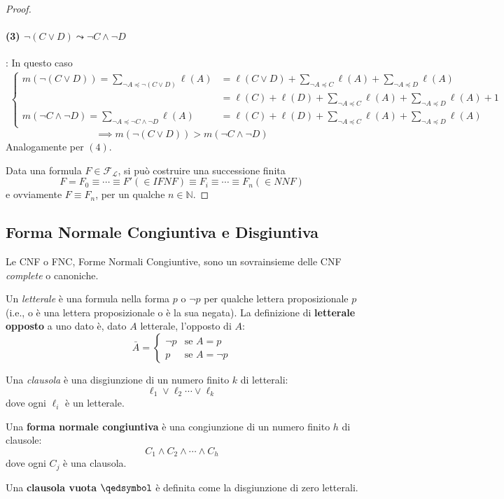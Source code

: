 \begin{proof}
\paragraph{(3) $\neg (C \lor D) \leadsto \neg C \land \neg D$}: In questo caso
\begin{align*}
  \begin{cases}
    m(\neg (C \lor D)) = \sum\limits_{\neg A \preccurlyeq \neg (C \lor D)} \ell(A) & = \ell(C \lor D) + \sum\limits_{\neg A \preccurlyeq C} \ell(A) + \sum\limits_{\neg A \preccurlyeq D} \ell(A) \\
      & = \ell(C) + \ell(D) + \sum\limits_{\neg A \preccurlyeq C} \ell(A) + \sum\limits_{\neg A \preccurlyeq D} \ell(A) + 1 \\
    m(\neg C \land \neg D) = \sum\limits_{\neg A \preccurlyeq \neg C \land \neg D} \ell(A) & = \ell(C) + \ell(D) + \sum\limits_{\neg A \preccurlyeq C} \ell(A) + \sum\limits_{\neg A \preccurlyeq D} \ell(A)
  \end{cases}
\end{align*}
$$
  \implies m(\neg (C \lor D)) > m(\neg C \land \neg D)
$$
Analogamente per $(4)$.

Data una formula $F \in \mathscr{F_L}$, si può costruire una successione 
finita 
$$ 
F = F_0 \equiv \cdots \equiv F' (\in IFNF) \equiv F_i \equiv \cdots \equiv F_n (\in NNF)
$$
e ovviamente $F \equiv F_n$, per un qualche $n \in \mathbb{N}$. 
\end{proof}

\subsection{Forma Normale Congiuntiva e Disgiuntiva}
Le CNF o FNC, Forme Normali Congiuntive, sono un sovrainsieme delle CNF \textit{complete} o canoniche.
\begin{defi}[Letterale]
Un \textit{letterale} è una formula nella forma $p$ o $\neg p$ per qualche lettera proposizionale $p$ (i.e., o è una lettera proposizionale o è la sua negata).
La definizione di \textbf{letterale opposto} a uno dato è, dato $A$ letterale, l'opposto di $A$:
$$
\bar{A} = 
\begin{cases}
  \neg p & \text{se } A = p \\
  p & \text{se } A = \neg p
\end{cases}
$$
\end{defi}
\begin{defi}[Clausola]
Una \textit{clausola} è una disgiunzione di un numero finito $k$ di letterali:
$$
\ell_1 \lor \ell_2 \cdots \lor \ell_k
$$
dove ogni $\ell_i$ è un letterale. 
\end{defi}
\begin{defi}
Una \textbf{forma normale congiuntiva} è una congiunzione di un numero finito $h$ di 
clausole: 
$$
C_1 \land C_2 \land \cdots \land C_h
$$
dove ogni $C_j$ è una clausola. 
\end{defi}
\begin{defi}
Una \textbf{clausola vuota} $\qedsymbol$ è definita come la disgiunzione 
di zero letterali. 
\end{defi}


